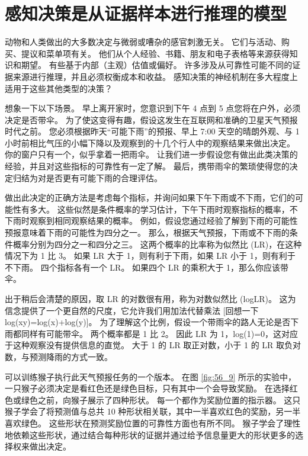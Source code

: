 \section{感知决策是从证据样本进行推理的模型}

动物和人类做出的大多数决定与微弱或嘈杂的感官刺激无关。
它们与活动、购买、提议和菜单项有关。
他们从个人经验、书籍、朋友和电子表格等来源获得知识和期望。
有些基于内部（主观）估值或偏好。
许多涉及从可靠性可能不同的证据来源进行推理，并且必须权衡成本和收益。
感知决策的神经机制在多大程度上适用于这些其他类型的决策？


想象一下以下场景。
早上离开家时，您意识到下午 4 点到 5 点您将在户外，必须决定是否带伞。
为了使这变得有趣，假设这发生在互联网和准确的卫星天气预报时代之前。
您必须根据昨天“可能下雨”的预报、早上 7:00 天空的晴朗外观、与 1 小时前相比气压的小幅下降以及观察到的十几个行人中的观察结果来做出决定。
你的窗户只有一个，似乎拿着一把雨伞。
让我们进一步假设您有做出此类决策的经验，并且对这些指标的可靠性有一定了解。
最后，携带雨伞的繁琐使得您的决定归结为对是否更有可能下雨的合理评估。


做出此决定的正确方法是考虑每个指标，并询问如果下午下雨或不下雨，它们的可能性有多大。
这些似然是条件概率的学习估计，下午下雨时观察指标的概率，不下雨时观察到相同观察结果的概率。
例如，假设您通过经验了解到下雨的可能性预报意味着下雨的可能性为四分之一。
那么，根据天气预报，下雨或不下雨的条件概率分别为四分之一和四分之三。
这两个概率的比率称为似然比 (LR)，在这种情况下为 1 比 3。
如果 LR 大于 1，则有利于下雨，如果 LR 小于 1，则有利于不下雨。
四个指标各有一个 LR。 如果四个 LR 的乘积大于 1，那么你应该带伞。


出于稍后会清楚的原因，取 LR 的对数很有用，称为对数似然比 (logLR)。
这为信念提供了一个更自然的尺度，它允许我们用加法代替乘法 [回想一下 log(xy)=log(x)+log(y)]。
为了理解这个比例，假设一个带雨伞的路人无论是否下雨都同样有可能带伞。
两个概率都是 1 比 2。
因此 LR 为 1，log(1)=0，这对应于这种观察没有提供信息的直觉。
大于 1 的 LR 取正对数，小于 1 的 LR 取负对数，与预测降雨的方式一致。


可以训练猴子执行此天气预报任务的一个版本。
在图 \ref{fig:56_9} 所示的实验中，一只猴子必须决定是看红色还是绿色目标，只有其中一个会导致奖励。
在选择红色或绿色之前，向猴子展示了四种形状。
每一个都作为奖励位置的指示器。
这只猴子学会了将预测值与总共 10 种形状相关联，其中一半喜欢红色的奖励，另一半喜欢绿色。
这些形状在预测奖励位置的可靠性方面也有所不同。
猴子学会了理性地依赖这些形状，通过结合每种形状的证据并通过给予信息量更大的形状更多的选择权来做出决定。


